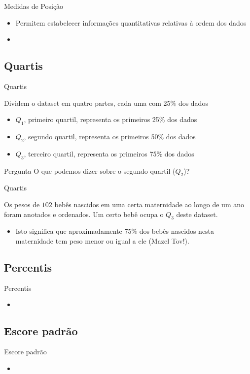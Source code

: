 \documentclass{beamer}
\begin{document}
\begin{frame}{Medidas de Posição}
  \begin{itemize}
  \item Permitem estabelecer informações quantitativas relativas à
    ordem dos dados
  \item
  \end{itemize}
\end{frame}

\subsection{Quartis}
\begin{frame}{Quartis}
  \begin{definition}
    Dividem o dataset em quatro partes, cada uma com 25\% dos dados
  \end{definition}
  \begin{itemize}
  \item $Q_1$, primeiro quartil, representa os primeiros 25\% dos dados
  \item $Q_2$, segundo quartil, representa os primeiros 50\% dos dados
  \item $Q_3$, terceiro quartil, representa os primeiros 75\% dos dados
  \end{itemize}
  \begin{block}{Pergunta}
    O que podemos dizer sobre o segundo quartil ($Q_2$)?    
  \end{block}
\end{frame}

\begin{frame}{Quartis}
  \begin{example}
    Os pesos de $102$ bebês nascidos em uma certa maternidade ao longo
    de um ano foram anotados e ordenados. Um certo bebê ocupa o $Q_3$
    deste dataset.

    \begin{itemize}
    \item Isto significa que aproximadamente 75\% dos bebês nascidos nesta
    maternidade tem peso menor ou igual a ele (Mazel Tov!).
  \end{itemize}
\end{example}
\end{frame}

\subsection{Percentis}
\begin{frame}{Percentis}
  \begin{itemize}
  \item 
  \end{itemize}
\end{frame}

\subsection{Escore padrão}
\begin{frame}{Escore padrão}
  \begin{itemize}
  \item 
  \end{itemize}
\end{frame}
\end{document}

